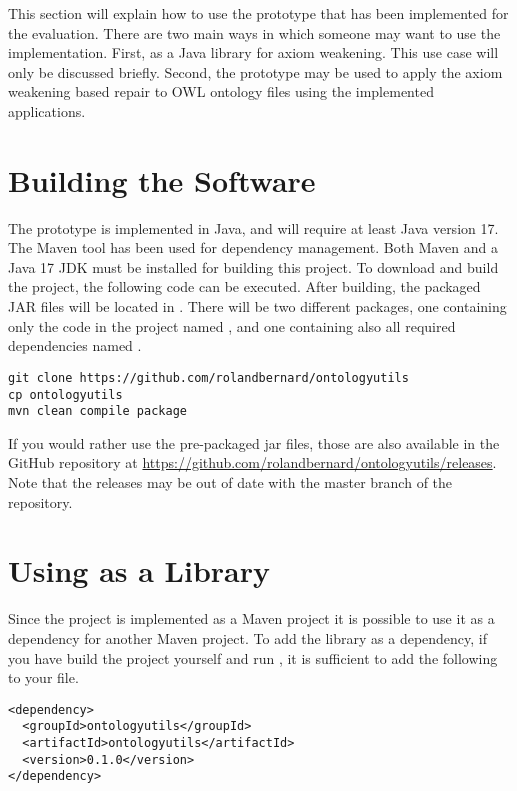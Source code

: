 
This section will explain how to use the prototype that has been implemented for the evaluation. There are two main ways in which someone may want to use the implementation. First, as a Java library for axiom weakening. This use case will only be discussed briefly. Second, the prototype may be used to apply the axiom weakening based repair to OWL ontology files using the implemented applications.

\section{Building the Software}

The prototype is implemented in Java, and will require at least Java version 17. The Maven tool has been used for dependency management. Both Maven and a Java 17 JDK must be installed for building this project. To download and build the project, the following code can be executed. After building, the packaged JAR files will be located in . There will be two different packages, one containing only the code in the project named , and one containing also all required dependencies named .

\begin{lstlisting}
git clone https://github.com/rolandbernard/ontologyutils
cp ontologyutils
mvn clean compile package
\end{lstlisting}

If you would rather use the pre-packaged jar files, those are also available in the GitHub repository at \url{https://github.com/rolandbernard/ontologyutils/releases}. Note that the releases may be out of date with the master branch of the repository.

\section{Using as a Library}

Since the project is implemented as a Maven project it is possible to use it as a dependency for another Maven project. To add the library as a dependency, if you have build the project yourself and run , it is sufficient to add the following to your  file. 

\begin{lstlisting}
<dependency>
  <groupId>ontologyutils</groupId>
  <artifactId>ontologyutils</artifactId>
  <version>0.1.0</version>
</dependency>
\end{lstlisting}

